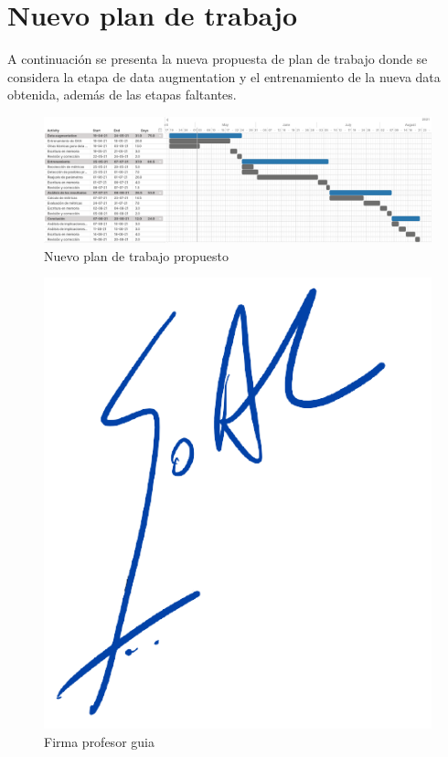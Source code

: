 \section{Nuevo plan de trabajo}
A continuación se presenta la nueva propuesta de plan de trabajo donde se considera la etapa de data augmentation y el entrenamiento de la nueva data obtenida, además de las etapas faltantes.

\begin{figure}[!ht]
    \centering
    \includegraphics[scale=0.458]{images/newPlan.png}
    \caption{Nuevo plan de trabajo propuesto}
    \label{fig:newPlan}
\end{figure}

\begin{figure}[!bt]
    \centering
    \includegraphics[scale=0.3]{images/firma2.png}
    \caption{Firma profesor guia}
    \label{fig:firma}
\end{figure}

